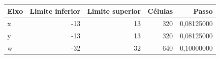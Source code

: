 \begin{tabular}{lrrrr}
\toprule
Eixo & Limite inferior & Limite superior & Células & Passo \\
\midrule
x & -13 & 13 & 320 & 0,08125000 \\
y & -13 & 13 & 320 & 0,08125000 \\
w & -32 & 32 & 640 & 0,10000000 \\
\bottomrule
\end{tabular}

